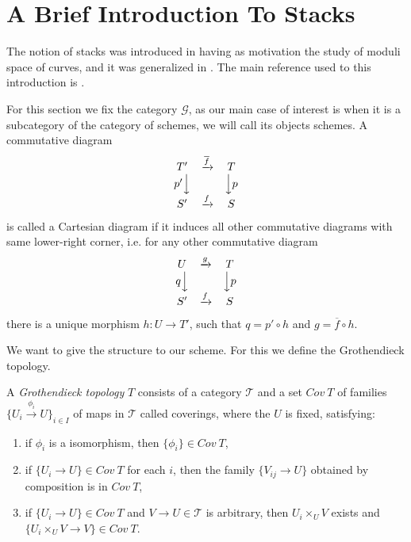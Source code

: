 \documentclass[
	oldfontcommands,
	sumario=abnt-6027-2012,
	12pt,			%
	openright,		%
	oneside,		%
	a4paper,		%
	english,		%
	brazil			%
	]{imecc-unicamp}
\begin{document}
\section{A Brief Introduction To Stacks}


The notion of stacks was introduced in \cite{Deligne1969} having as motivation the study of moduli space of curves, and it was generalized in \cite{Artin1974}. The main reference used to this introduction is \cite{FantechiBarbara}.

For this section we fix the category $\mathcal G$, as our main case of interest is when it is a subcategory of the category of schemes, we will call its objects schemes. A commutative diagram 
$$
\begin{matrix}
T'&\xrightarrow {\overline f} &T\\
p'\Big\downarrow& &\Big\downarrow p\\
S'&\xrightarrow{f}&S

\end{matrix}
$$
is called a Cartesian diagram if it induces all other commutative diagrams with same lower-right corner, i.e. for any other commutative diagram $$
\begin{matrix}
U&\xrightarrow {g} &T\\
q\Big\downarrow& &\Big\downarrow p\\
S'&\xrightarrow{f}&S
\end{matrix}
$$
there is a unique morphism $h:U\rightarrow T'$, such that $q=p'\circ h$ and $g=\overline f\circ h$.

We want to give the structure to our scheme. For this we define the Grothendieck topology.
\begin{definition}
	A \textit{Grothendieck topology} $T$ consists of a category $\mathcal T$ and a set $Cov~T$ of families $\{U_i\xrightarrow{\phi_i} U\}_{i\in I}$ of maps in $\mathcal T$ called coverings, where the $U$ is fixed, satisfying:
	\begin{enumerate}
		\item if $\phi_i$ is a isomorphism, then $\{\phi_i\}\in Cov~T$,
		\item if $\{U_i\rightarrow U\}\in Cov~T$ for each $i$, then the family $\{V_{ij}\rightarrow U \}$ obtained by composition is in $Cov~T$,
		\item if $\{U_i\rightarrow U \}\in Cov~T$ and $V\rightarrow U\in\mathcal T$ is arbitrary, then $U_i\times_U V$ exists and $\{U_i\times_U V\rightarrow V  \}\in Cov~T$. 
	\end{enumerate}
\end{definition}
\end{document}
